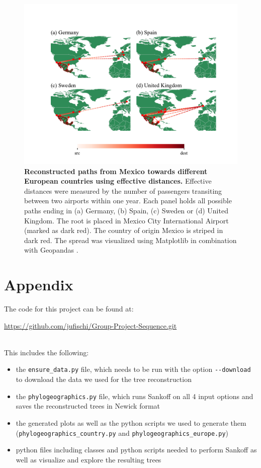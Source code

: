 \documentclass{article}
\begin{document}
\begin{figure}[h!]
    \centering
    \includegraphics[width=\linewidth,trim={0.5cm 0 0.5cm 0}]{airport_effective_europe.pdf}
    \caption{\textbf{Reconstructed paths from Mexico towards different European
    countries using effective distances.} Effective distances were measured by
    the number of passengers transiting between two airports within one year.
    Each panel holds all possible paths ending in (a) Germany, (b) Spain, (c)
    Sweden or (d) United Kingdom. The root is placed in Mexico City
    International Airport (marked as dark red). The country of origin Mexico is
    striped in dark red. The spread was visualized using Matplotlib
    \cite{MatplotlibVisualizationPython} in combination with Geopandas
    \cite{GeoPandas12GeoPandas}.}%
    \label{fig:Europe}
\end{figure}

\newpage
%   
%  
\printbibliography

\newpage
\appendix
\section*{Appendix}
The code for this project can be found at:

\url{https://github.com/jufischi/Group-Project-Sequence.git}

\ \\

This includes the following:
\begin{itemize}
    \item the \texttt{ensure\_data.py} file, which needs to be run with the
    option \texttt{-\texttt{-}download} to download the data we used for the
    tree reconstruction
    \item the \texttt{phylogeographics.py} file, which runs Sankoff on all 4
    input options and saves the reconstructed trees in Newick format
    \item the generated plots as well as the python scripts we used to generate
    them (\texttt{phylogeographics\_country.py} and
    \texttt{phylogeographics\_europe.py})
    \item python files including classes and python scripts needed to perform
    Sankoff as well as visualize and explore the resulting trees
\end{itemize} 
\end{document}
